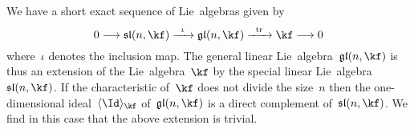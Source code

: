 \begin{example}
	We have a short exact sequence of Lie~algebras given by
	\[
		0
		\to
		\sllie(n, \kf)
		\xto{\iota}
		\gllie(n, \kf)
		\xto{\tr}
		\kf
		\to
		0
	\]
	where~$\iota$ denotes the inclusion map.
	The general linear Lie~algebra~$\gllie(n, \kf)$ is thus an extension of the {\onedimensional} Lie~algebra~$\kf$ by the special linear Lie~algebra~$\sllie(n, \kf)$.
	If the characteristic of~$\kf$ does not divide the size~$n$ then the one-dimensional ideal~$\gen{ \Id }_{\kf}$ of~$\gllie(n, \kf)$ is a direct complement of~$\sllie(n, \kf)$.
	We find in this case that the above extension is trivial.
\end{example}

